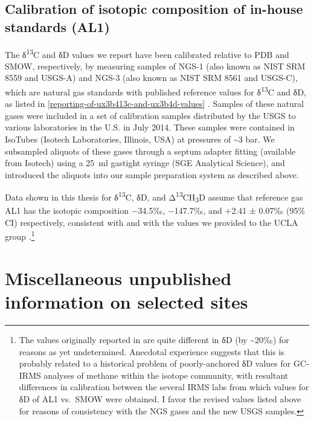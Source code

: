 \subsection{Calibration of isotopic composition of in-house standards
	(AL1)}\label{calibration-of-isotopic-composition-of-in-house-standards-al1}

%

The δ\textsuperscript{13}C and δD values we report have been calibrated
relative to PDB and SMOW, respectively, by measuring samples of NGS-1
(also known as NIST SRM 8559 and USGS-A) and NGS-3 (also known as NIST
SRM 8561 and USGS-C), which are natural gas standards with published
reference values for δ\textsuperscript{13}C and δD, as listed in \autoref{reporting-of-ux3b413c-and-ux3b4d-values} \parencite[supplementary materials in][]{Wang++_2015_S}. Samples of these natural gases were
included in a set of calibration samples distributed by the USGS to
various laboratories in the U.S. in July 2014. These samples were
contained in IsoTubes (Isotech Laboratories, Illinois, USA) at pressures
of \textasciitilde{}3 bar. We subsampled aliquots of these gases through
a septum adapter fitting (available from Isotech) using a 25~ml gastight
syringe (SGE Analytical Science), and introduced the aliquots into our
sample preparation system as described above.

Data shown in this thesis for δ\textsuperscript{13}C, δD, and
Δ\textsuperscript{13}CH\textsubscript{3}D assume that reference gas AL1
has the isotopic composition $-$34.5‰, $-$147.7‰, and $+$2.41 ± 0.07‰ (95\% CI)
respectively, consistent with \textcite{Wang++_2015_S} and with the values we
provided to the UCLA group \parencite{Young++_2016_IJMS}.\footnote{The values originally reported in \textcite{Ono++_2014_AC} are quite different in δD (by \textasciitilde{}20‰) for reasons as yet undetermined.  Anecdotal experience suggests that this is probably related to a historical problem of poorly-anchored δD values for GC-IRMS analyses of methane within the isotope community, with resultant differences in calibration between the several IRMS labs from which values for δD
of AL1 vs.\ SMOW were obtained.  I favor the revised values listed above for reasons of consistency with the NGS gases and the new USGS samples.} 

\section{Miscellaneous unpublished information on selected sites}\label{miscellaneous-unpublished-information}

